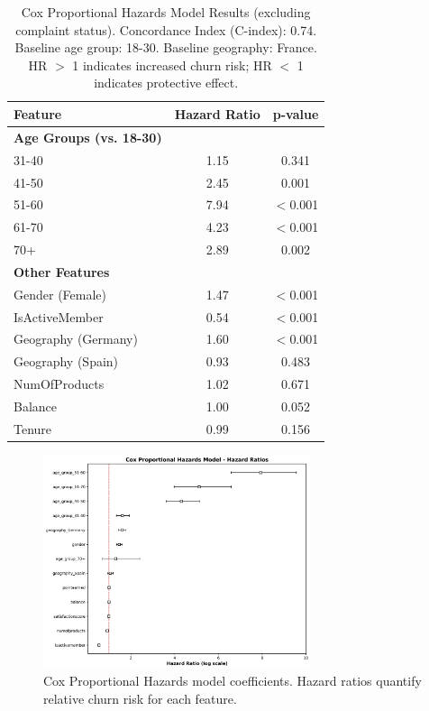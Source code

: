 \documentclass[12pt]{article}
\begin{document}
\begin{table}[H]
\centering
\small
\caption{Cox Proportional Hazards Model Results (excluding complaint status). Concordance Index (C-index): 0.74. Baseline age group: 18-30. Baseline geography: France. HR $>$ 1 indicates increased churn risk; HR $<$ 1 indicates protective effect.}
\label{tab:cox_results}
\begin{tabular}{lcc}
\toprule
\textbf{Feature} & \textbf{Hazard Ratio} & \textbf{p-value} \\
\midrule
\textbf{Age Groups (vs. 18-30)} & & \\
\phantom{---} 31-40 & 1.15 & 0.341 \\
\phantom{---} 41-50 & 2.45 & 0.001 \\
\phantom{---} 51-60 & 7.94 & $<$0.001 \\
\phantom{---} 61-70 & 4.23 & $<$0.001 \\
\phantom{---} 70+ & 2.89 & 0.002 \\
\midrule
\textbf{Other Features} & & \\
\phantom{---} Gender (Female) & 1.47 & $<$0.001 \\
\phantom{---} IsActiveMember & 0.54 & $<$0.001 \\
\phantom{---} Geography (Germany) & 1.60 & $<$0.001 \\
\phantom{---} Geography (Spain) & 0.93 & 0.483 \\
\phantom{---} NumOfProducts & 1.02 & 0.671 \\
\phantom{---} Balance & 1.00 & 0.052 \\
\phantom{---} Tenure & 0.99 & 0.156 \\
\bottomrule
\end{tabular}
\end{table}

\begin{figure}[H]
\centering
\includegraphics[width=0.7\textwidth]{img/14_cox_ph_coefficients.png}
\caption{Cox Proportional Hazards model coefficients. Hazard ratios quantify relative churn risk for each feature.}
\label{fig:cox_coefficients}
\end{figure}
\end{document}
